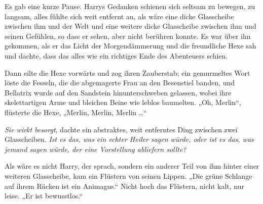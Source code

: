 Es gab eine kurze Pause. Harrys Gedanken schienen sich seltsam zu bewegen, zu langsam, alles fühlte sich weit entfernt an, als wäre eine dicke Glasscheibe zwischen ihm und der Welt und eine weitere dicke Glasscheibe zwischen ihm und seinen Gefühlen, so dass er sehen, aber nicht berühren konnte. Es war über ihn gekommen, als er das Licht der Morgendämmerung und die freundliche Hexe sah und dachte, dass das alles wie ein richtiges Ende des Abenteuers schien.

Dann eilte die Hexe vorwärts und zog ihren Zauberstab; ein gemurmeltes Wort löste die Fesseln, die die abgemagerte Frau an den Besenstiel banden, und Bellatrix wurde auf den Sandstein hinunterschweben gelassen, wobei ihre skelettartigen Arme und bleichen Beine wie leblos baumelten.
„Oh, Merlin“, flüsterte die Hexe,
„Merlin, Merlin, Merlin …“

\emph{Sie wirkt besorgt}, dachte ein abstraktes, weit entferntes Ding zwischen zwei Glasscheiben. \emph{Ist es das, was ein echter Heiler sagen würde, oder ist es das, was jemand sagen würde, der eine Vorstellung abliefern sollte?}

Als wäre es nicht Harry, der sprach, sondern ein anderer Teil von ihm hinter einer weiteren Glasscheibe, kam ein Flüstern von seinen Lippen.
„Die grüne Schlange auf ihrem Rücken ist ein Animagus.“ Nicht hoch das Flüstern, nicht kalt, nur leise.
„Er ist bewusstlos.“

